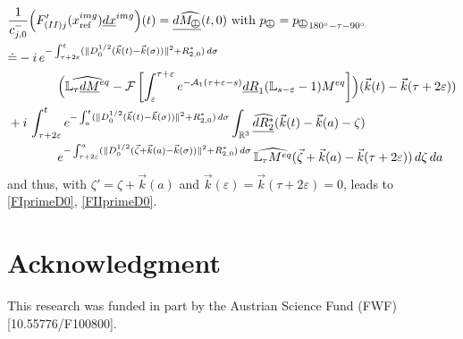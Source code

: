 \documentclass{ws-m3as}
\newcommand{\uld}[1]{\underline{d#1}}
\def\Mpp{M_{\perp\!\!\!\!\!\bigcirc}}
\def\Mphp{\widehat{\Mpp}}
\def\pp{p_{\perp\!\!\!\!\!\bigcirc}}
\newcommand\taup{\varepsilon}
\newcommand{\Dterm}[1]{\|D_0^{1/2}{#1}\|^2}
\begin{document}
\begin{equation*}%
\begin{aligned}
&\frac{1}{c_{j,0}^-}\Bigl(F_{(II)j}'(x^{img}_{\text{ref}})\uld{x}^{img}\Bigr)(t)= 
\uld{\Mphp}(t,0) \text{ with }\pp={\pp}_{180^\circ-\tau-90^\circ}\\
&\dot{=}
-i\,e^{-\int_{\tau+2\taup}^t(\Dterm{({\vec k}(t)-\vec k(\sigma))}+R_{2,0}^*)\, d\sigma}\\
&\qquad\qquad\Bigl(\widehat{\mathbb{L}_\tau \uld{M}^{eq}}
-\mathcal{F}\left[\int_\taup^{\tau+\taup}e^{-\mathcal{A}_1(\tau+\taup-s)}\uld{R}_1(\mathbb{L}_{s-\taup}-1)M^{eq}\right]\Bigr)({\vec k}(t)-{\vec k}(\tau+2\taup))
\\&+i\,\int_{\tau+2\taup}^t e^{-\int_a^t(\Dterm{({\vec k}(t)-\vec k(\sigma))}+R_{2,0}^*)\, d\sigma}
\int_{\mathbb{R}^3}\widehat{\uld{R_2^*}}({\vec k}(t)-{\vec k}(a)-\zeta)\\
&\qquad\qquad e^{-\int_{\tau+2\taup}^a(\Dterm{(\vec\zeta+{\vec k}(a)-\vec k(\sigma))} +R_{2,0}^*)\, d\sigma}\,\widehat{\mathbb{L}_\tau M^{eq}}(\vec\zeta+{\vec k}(a)-\vec k(\tau+2\taup))
\,d\zeta\, da
\end{aligned}
\end{equation*}
and thus, with $\zeta'=\zeta+{\vec k}(a)$ and $\vec k(\taup)=\vec k(\tau+2\taup)=0$, leads to  \eqref{FIprimeD0}, \eqref{FIIprimeD0}.

\section*{Acknowledgment}
This research was funded in part by the Austrian Science Fund (FWF) 
[10.55776/F100800]. 
\end{document}
